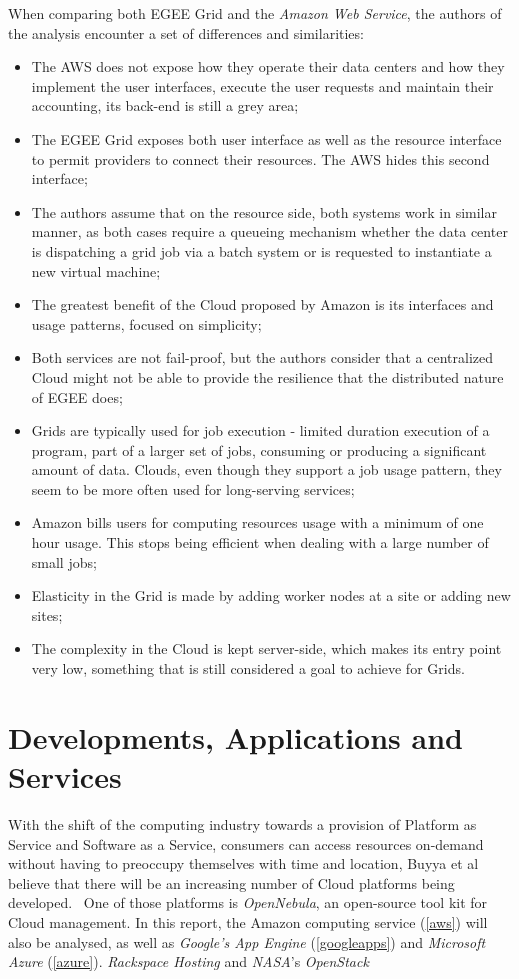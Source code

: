 When comparing both EGEE Grid and the \textit{Amazon Web Service}, the authors of the analysis encounter a set of differences and similarities:
\begin{itemize}
\item The AWS does not expose how they operate their data centers and how they implement the user interfaces, execute the user requests and maintain their accounting, its back-end is still a grey area;
\item The EGEE Grid exposes both user interface as well as the resource interface to permit providers to connect their resources. The AWS hides this second interface;
\item The authors assume that on the resource side, both systems work in similar manner, as both cases require a queueing mechanism whether the data center is dispatching a grid job via a batch system or is requested to instantiate a new virtual machine;
\item The greatest benefit of the Cloud proposed by Amazon is its interfaces and usage patterns, focused on simplicity;
\item Both services are not fail-proof, but the authors consider that a centralized Cloud might not be able to provide the resilience that the distributed nature of EGEE does;
\item Grids are typically used for job execution - limited duration execution of a program, part of a larger set of jobs, consuming or producing a significant amount of data. Clouds, even though they support a job usage pattern, they seem to be more often used for long-serving services;
\item Amazon bills users for computing resources usage with a minimum of one hour usage. This stops being efficient when dealing with a large number of small jobs;
\item Elasticity in the Grid is made by adding worker nodes at a site or adding new sites;
\item The complexity in the Cloud is kept server-side, which makes its entry point very low, something that is still considered a goal to achieve for Grids. \cite{grids-and-clouds}
\end{itemize}


\section{Developments, Applications and Services}
With the shift of the computing industry towards a provision of Platform as Service and Software as a Service, consumers can access resources on-demand without having to preoccupy themselves with time and location, Buyya et al believe that there will be an increasing number of Cloud platforms being developed.~\cite{Buyya2009599} One of those platforms is \textit{OpenNebula}, an open-source tool kit for Cloud management. In this report, the Amazon computing service (\ref{aws}) will also be analysed, as well as \textit{Google's App Engine} (\ref{googleapps}) and \textit{Microsoft Azure} (\ref{azure}).
\textit{Rackspace Hosting} and \textit{NASA}'s \textit{OpenStack} 

